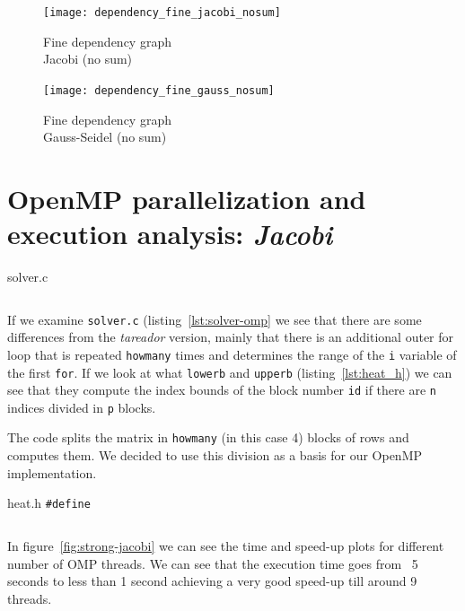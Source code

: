\begin{figure}[H]
    \begin{minipage}{0.5\textwidth}
        \centering
        \texttt{[image: dependency\_fine\_jacobi\_nosum]}
        \caption{Fine dependency graph \\ Jacobi (no sum)}%
        \label{fig:dependency_fine_jacobi_nosum}
    \end{minipage}
    \begin{minipage}{0.5\textwidth}
        \centering
        \texttt{[image: dependency\_fine\_gauss\_nosum]}
        \caption{Fine dependency graph \\ Gauss-Seidel (no sum)}%
        \label{fig:dependency_fine_gauss_nosum}
    \end{minipage}
\end{figure}

\pagebreak
\section{OpenMP parallelization and execution analysis: \emph{Jacobi}}

\begin{listing}[H]
    \caption{solver.c}%
    \label{lst:solver-omp}
    \inputminted[firstline=17,lastline=39]{c}{code/solver-omp-orig.c}
\end{listing}

If we examine \texttt{solver.c} (listing~\ref{lst:solver-omp} we see that there are some differences 
from the \emph{tareador} version,
mainly that there is an additional outer for loop that is repeated \texttt{howmany} times and determines the
range of the \texttt{i} variable of the first \texttt{for}. If we look at what \texttt{lowerb} and
\texttt{upperb} (listing~\ref{lst:heat_h}) we can see that they compute the index bounds of the block
number \texttt{id} if there are \texttt{n} indices divided in \texttt{p} blocks.

The code splits the matrix in \texttt{howmany} (in this case 4) blocks of rows and computes them.
We decided to use this division as a basis for our OpenMP implementation.

\begin{listing}[H]
    \caption{heat.h \texttt{\#define}}%
    \label{lst:heat_h}
    \inputminted[firstline=59,lastline=61]{c}{code/heat.h}
\end{listing}

In figure~\ref{fig:strong-jacobi} we can see the time and speed-up plots for different number 
of OMP threads. We can see that the execution time goes from ~5 seconds to less than 1 second
achieving a very good speed-up till around 9 threads.

